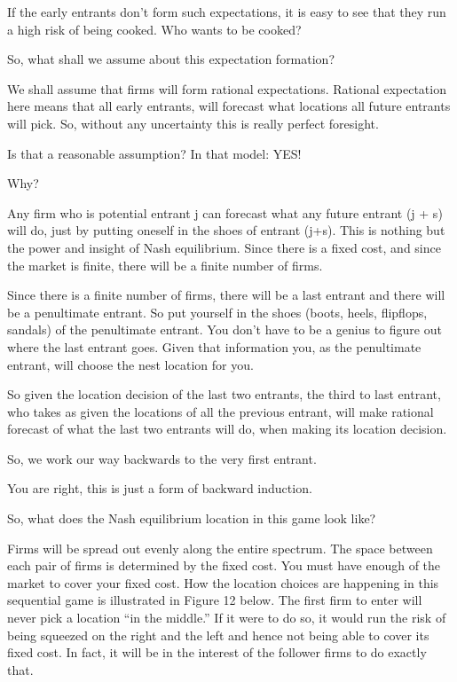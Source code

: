 \documentclass[
]{book}
\begin{document}
If the early entrants don't form such expectations, it is easy to see that they run a high risk of being cooked. Who wants to be cooked?

So, what shall we assume about this expectation formation?

We shall assume that firms will form rational expectations. Rational expectation here means that all early entrants, will forecast what locations all future entrants will pick. So, without any uncertainty this is really perfect foresight.

Is that a reasonable assumption? In that model: YES!

Why?

Any firm who is potential entrant j can forecast what any future entrant (j + s) will do, just by putting oneself in the shoes of entrant (j+s). This is nothing but the power and insight of Nash equilibrium. Since there is a fixed cost, and since the market is finite, there will be a finite number of firms.

Since there is a finite number of firms, there will be a last entrant and there will be a penultimate entrant. So put yourself in the shoes (boots, heels, flipflops, sandals) of the penultimate entrant. You don't have to be a genius to figure out where the last entrant goes. Given that information you, as the penultimate entrant, will choose the nest location for you.

So given the location decision of the last two entrants, the third to last entrant, who takes as given the locations of all the previous entrant, will make rational forecast of what the last two entrants will do, when making its location decision.

So, we work our way backwards to the very first entrant.

You are right, this is just a form of backward induction.

So, what does the Nash equilibrium location in this game look like?

Firms will be spread out evenly along the entire spectrum. The space between each pair of firms is determined by the fixed cost. You must have enough of the market to cover your fixed cost. How the location choices are happening in this sequential game is illustrated in Figure 12 below. The first firm to enter will never pick a location ``in the middle.'' If it were to do so, it would run the risk of being squeezed on the right and the left and hence not being able to cover its fixed cost. In fact, it will be in the interest of the follower firms to do exactly that.
\end{document}
